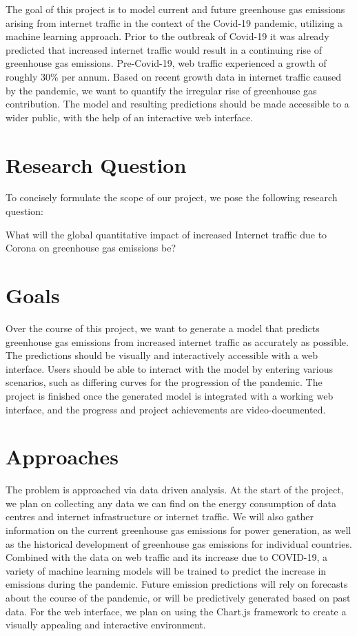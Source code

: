 \documentclass[s=english,inputenc=utf8,fontsize=10pt]{ldvarticle}
\begin{document}
The goal of this project is to model current and future greenhouse gas emissions arising from internet traffic in the context of the Covid-19 pandemic, utilizing a machine learning approach. Prior to the outbreak of Covid-19 it was already predicted that increased internet traffic would result in a continuing rise of greenhouse gas emissions. Pre-Covid-19, web traffic experienced a growth of roughly 30\% per annum. Based on recent growth data in internet traffic caused by the pandemic, we want to quantify the irregular rise of greenhouse gas contribution. The model and resulting predictions should be made accessible to a wider public, with the help of an interactive web interface.

\section*{Research Question}

To concisely formulate the scope of our project, we pose the following research question:

What will the global quantitative impact of increased Internet traffic due to Corona on greenhouse gas emissions be?

\section*{Goals}

Over the course of this project, we want to generate a model that predicts greenhouse gas emissions from increased internet traffic as accurately as possible. The predictions should be visually and interactively accessible with a web interface. Users should be able to interact with the model by entering various scenarios, such as differing curves for the progression of the pandemic. The project is finished once the generated model is integrated with a working web interface, and the progress and project achievements are video-documented.
\section*{Approaches}

The problem is approached via data driven analysis. At the start of the project, we plan on collecting any data we can find on the energy consumption of data centres and internet infrastructure or internet traffic. We will also gather information on the current greenhouse gas emissions for power generation, as well as the historical development of greenhouse gas emissions for individual countries. Combined with the data on web traffic and its increase due to COVID-19, a variety of machine learning models will be trained to predict the increase in emissions during the pandemic. Future emission predictions will rely on forecasts about the course of the pandemic, or will be predictively generated based on past data.
For the web interface, we plan on using the Chart.js framework to create a visually appealing and interactive environment.
\end{document}
